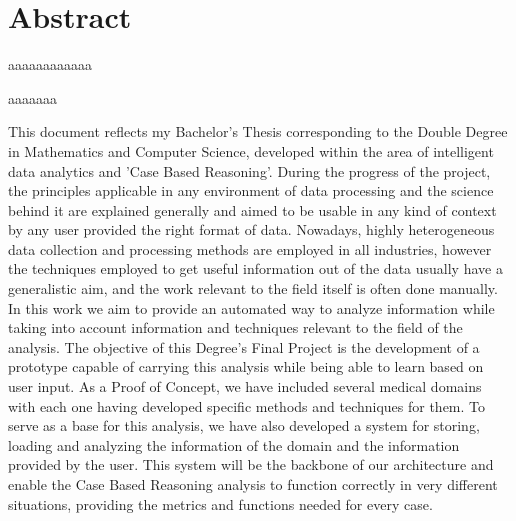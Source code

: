 %
%
%
%
%

\chapter{Abstract}

\begin{FraseCelebre}
\begin{Frase}
aaaaaaaaaaaa
\end{Frase}
\begin{Fuente}
aaaaaaa
\end{Fuente}
\end{FraseCelebre}

This document reflects my Bachelor's Thesis corresponding to the Double Degree in Mathematics and Computer Science, developed within the area of intelligent data analytics and 'Case Based Reasoning'. 
During the progress of the project, the principles applicable in any environment of data processing and the science behind it are explained generally and aimed to be usable in any kind of context by any user provided the right format of data.
Nowadays, highly heterogeneous data collection and processing methods are employed in all industries, 
however the techniques employed to get useful information out of the data usually have a generalistic aim, 
and the work relevant to the field itself is often done manually. In this work we aim to provide an automated way to analyze information while taking into account information and techniques relevant to the field of the analysis.
The objective of this Degree's Final Project is the development of a prototype capable of carrying this analysis while being able to learn based on user input. As a Proof of Concept, we have included several medical domains with each one having developed specific methods and techniques for them.
To serve as a base for this analysis, we have also developed a system for storing, loading and analyzing the information of the domain and the information provided by the user. This system will be the backbone of our architecture and enable the Case Based Reasoning analysis to function correctly in very different situations, providing the metrics and functions needed for every case.

